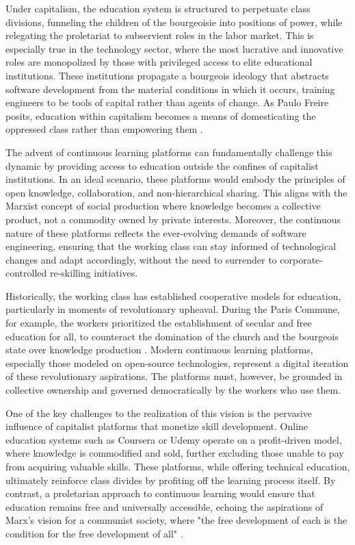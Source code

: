 \begin{refsection}
Under capitalism, the education system is structured to perpetuate class divisions, funneling the children of the bourgeoisie into positions of power, while relegating the proletariat to subservient roles in the labor market. This is especially true in the technology sector, where the most lucrative and innovative roles are monopolized by those with privileged access to elite educational institutions. These institutions propagate a bourgeois ideology that abstracts software development from the material conditions in which it occurs, training engineers to be tools of capital rather than agents of change. As Paulo Freire posits, education within capitalism becomes a means of domesticating the oppressed class rather than empowering them \cite[pp.~74]{freire_pedagogy}. 

The advent of continuous learning platforms can fundamentally challenge this dynamic by providing access to education outside the confines of capitalist institutions. In an ideal scenario, these platforms would embody the principles of open knowledge, collaboration, and non-hierarchical sharing. This aligns with the Marxist concept of social production where knowledge becomes a collective product, not a commodity owned by private interests. Moreover, the continuous nature of these platforms reflects the ever-evolving demands of software engineering, ensuring that the working class can stay informed of technological changes and adapt accordingly, without the need to surrender to corporate-controlled re-skilling initiatives.

Historically, the working class has established cooperative models for education, particularly in moments of revolutionary upheaval. During the Paris Commune, for example, the workers prioritized the establishment of secular and free education for all, to counteract the domination of the church and the bourgeois state over knowledge production \cite[pp.~209]{marx_paris_commune}. Modern continuous learning platforms, especially those modeled on open-source technologies, represent a digital iteration of these revolutionary aspirations. The platforms must, however, be grounded in collective ownership and governed democratically by the workers who use them. 

One of the key challenges to the realization of this vision is the pervasive influence of capitalist platforms that monetize skill development. Online education systems such as Coursera or Udemy operate on a profit-driven model, where knowledge is commodified and sold, further excluding those unable to pay from acquiring valuable skills. These platforms, while offering technical education, ultimately reinforce class divides by profiting off the learning process itself. By contrast, a proletarian approach to continuous learning would ensure that education remains free and universally accessible, echoing the aspirations of Marx’s vision for a communist society, where "the free development of each is the condition for the free development of all" \cite[pp.~184]{marx_manifesto}.


\end{refsection}

